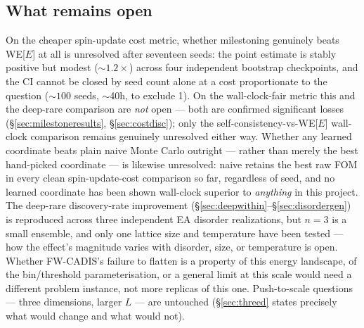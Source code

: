 \documentclass[11pt,a4paper]{article}
\begin{document}
\subsection{What remains open}
On the cheaper spin-update cost metric, whether milestoning genuinely beats WE[$E$] at all is
unresolved after seventeen seeds: the point estimate is stably positive but modest
($\sim\!1.2\times$) across four independent bootstrap checkpoints, and the CI cannot be closed by
seed count alone at a cost proportionate to the question ($\sim\!100$ seeds, $\sim$40h, to exclude
1). On the wall-clock-fair metric this and the deep-rare comparison are \emph{not} open --- both
are confirmed significant losses (\S\ref{sec:milestoneresults}, \S\ref{sec:costdisc}); only the
self-consistency-vs-WE[$E$] wall-clock comparison remains genuinely unresolved either way. Whether
any learned coordinate beats plain naive Monte Carlo outright --- rather than merely the best
hand-picked coordinate --- is likewise unresolved: naive retains the best raw FOM in every clean
spin-update-cost comparison so far, regardless of seed, and no learned coordinate has been shown
wall-clock superior to \emph{anything} in this project. The deep-rare discovery-rate improvement
(\S\ref{sec:deepwithin}--\S\ref{sec:disordergen}) is reproduced across three independent EA
disorder realizations, but $n=3$ is a small ensemble, and only one lattice size and temperature
have been tested --- how the effect's magnitude varies with disorder, size, or temperature is
open. Whether FW-CADIS's failure to flatten is a property of this energy landscape, of the
bin/threshold parameterisation, or a general limit at this scale would need a different problem
instance, not more replicas of this one. Push-to-scale questions --- three dimensions, larger $L$
--- are untouched (\S\ref{sec:threed} states precisely what would change and what would not).
\end{document}
